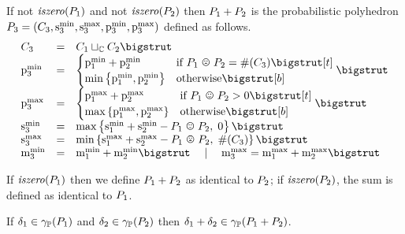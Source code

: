 \begin{definition}
\label{def:pplus}
If not $ \mathit{iszero}(P_{1}) $ and not $ \mathit{iszero}(P_{2}) $ then $P_{1} + P_{2}$ is the probabilistic polyhedron $P_{3} = (C_{3},\mathrm{s}^\mathrm{min}_{3},\mathrm{s}^\mathrm{max}_{3},\mathrm{p}^\mathrm{min}_{3},\mathrm{p}^\mathrm{max}_{3})$ defined as follows.
\[
\begin{array}{lcl}
\getpoly{3} &=& \pa \pjoin \pb \bigstrut \\
\pmin{3} &=& 
\begin{cases}
\pmin{1} + \pmin{2} & \text{if } \pessoverlap{\ppa}{\ppb} = \psize{\getpoly{3}} \bigstrut[t] \\
\minparen{\pmin{1}, \pmin{2}} & \text{otherwise}\bigstrut[b] 
\end{cases} \bigstrut \\

\pmax{3} &=&
\begin{cases}
\pmax{1} + \pmax{2} & \text{if } \optoverlap{\ppa}{\ppb} > 0 \bigstrut[t] \\
\maxparen{\pmax{1}, \pmax{2}} & \text{otherwise}\bigstrut[b]
\end{cases} \bigstrut \\

\smin{3} &=& \maxparen{\smin{1} + \smin{2} - \optoverlap{\ppa}{\ppb},
  \; 0} \bigstrut \\

\smax{3} &=& \minparen{\smax{1} + \smax{2} - \pessoverlap{\ppa}{\ppb},
\; \psize{\getpoly{3}}} \bigstrut \\

\mmin{3} &=& \mmin{1} + \mmin{2} \bigstrut \quad \mid \quad
\mmax{3} = \mmax{1} + \mmax{2} \bigstrut  \\
\end{array}
\]

If $ \mathit{iszero}(P_{1})$ then we define $ P_{1} + P_{2} $ as identical 
to $ P_{2} $; if $ \mathit{iszero}(P_{2}) $, the sum is defined as
identical to $ P_{1} $. 
\end{definition}

\begin{lemma}
\label{lem:pp:plus}
If $\delta_1 \in \gamma_{\mathbb{P}}(P_{1})$ and $\delta_2 \in \gamma_{\mathbb{P}}(P_{2})$ then $\delta_1 + \delta_2 \in \gamma_{\mathbb{P}}(P_{1} + P_{2})$.
\end{lemma}

